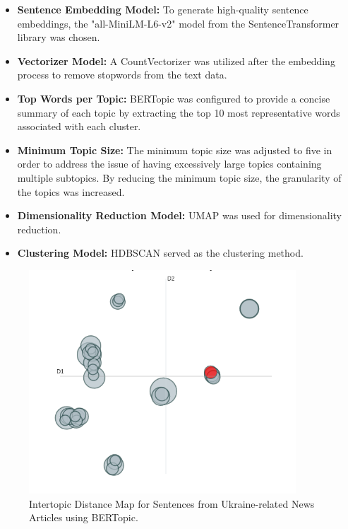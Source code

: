 \documentclass[a4paper,10pt]{report}
\begin{document}
\begin{itemize}
    \item \textbf{Sentence Embedding Model:} To generate high-quality sentence embeddings, the "all-MiniLM-L6-v2" model from the SentenceTransformer library was chosen.

    \item \textbf{Vectorizer Model:} A CountVectorizer was utilized after the embedding process to remove stopwords from the text data.

    \item \textbf{Top Words per Topic:} BERTopic was configured to provide a concise summary of each topic by extracting the top 10 most representative words associated with each cluster.

    \item \textbf{Minimum Topic Size:} The minimum topic size was adjusted to five in order to address the issue of having excessively large topics containing multiple subtopics. By reducing the minimum topic size, the granularity of the topics was increased.

    \item \textbf{Dimensionality Reduction Model:} UMAP was used for dimensionality reduction.

    \item \textbf{Clustering Model:} HDBSCAN served as the clustering method.
\end{itemize}

\begin{figure}
  \centering
  \includegraphics[width=10cm]{img/intertopic_distance_map.png}
  \caption{Intertopic Distance Map for Sentences from Ukraine-related News Articles using BERTopic.}
  \label{fig:intertopic_distance_map}
\end{figure}
\end{document}
